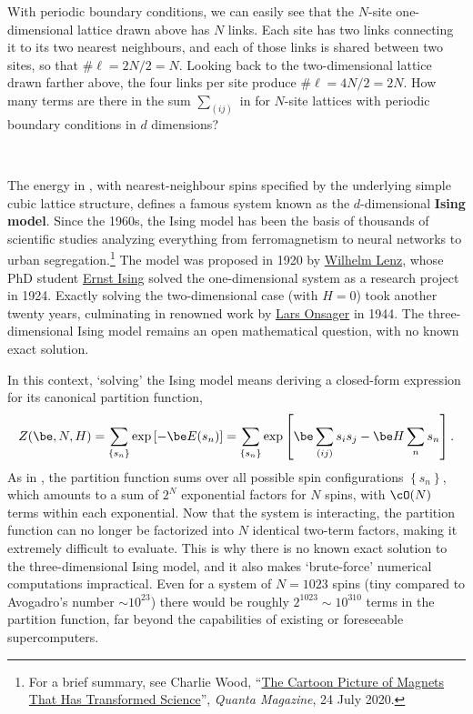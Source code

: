 With periodic boundary conditions, we can easily see that the $N$-site one-dimensional lattice drawn above has $N$ links.
Each site has two links connecting it to its two nearest neighbours, and each of those links is shared between two sites, so that $\#\ell = 2N / 2 = N$.
Looking back to the two-dimensional lattice drawn farther above, the four links per site produce $\#\ell = 4N / 2 = 2N$.
How many terms are there in the sum $\sum_{(ij)}$ in  for $N$-site lattices with periodic boundary conditions in $d$ dimensions?
\begin{mdframed}
  \ \\[50 pt]
\end{mdframed}

The energy in , with nearest-neighbour spins specified by the underlying simple cubic lattice structure, defines a famous system known as the $d$-dimensional \textbf{Ising model}.
Since the 1960s, the Ising model has been the basis of thousands of scientific studies analyzing everything from ferromagnetism to neural networks to urban segregation.\footnote{For a brief summary, see Charlie Wood, ``\href{https://www.quantamagazine.org/the-cartoon-picture-of-magnets-that-has-transformed-science-20200624/}{The Cartoon Picture of Magnets That Has Transformed Science}'', \textit{Quanta Magazine}, 24 July 2020.}
The model was proposed in 1920 by \href{https://en.wikipedia.org/wiki/Wilhelm_Lenz}{Wilhelm Lenz}, whose PhD student \href{https://en.wikipedia.org/wiki/Ernst_Ising}{Ernst Ising} solved the one-dimensional system as a research project in 1924.
Exactly solving the two-dimensional case (with $H = 0$) took another twenty years, culminating in renowned work by \href{https://en.wikipedia.org/wiki/Lars_Onsager}{Lars Onsager} in 1944.
The three-dimensional Ising model remains an open mathematical question, with no known exact solution.

In this context, `solving' the Ising model means deriving a closed-form expression for its canonical partition function,
\begin{equation*}
  Z(\be, N, H) = \sum_{\left\{s_n\right\}} \exp\left[-\be E(s_n)\right] = \sum_{\left\{s_n\right\}} \exp\left[\be\sum_{(ij)} s_i s_j - \be H \sum_n s_n\right].
\end{equation*}
As in , the partition function sums over all possible spin configurations $\left\{s_n\right\}$, which amounts to a sum of $2^N$ exponential factors for $N$ spins, with $\cO(N)$ terms within each exponential.
Now that the system is interacting, the partition function can no longer be factorized into $N$ identical two-term factors, making it extremely difficult to evaluate.
This is why there is no known exact solution to the three-dimensional Ising model, and it also makes `brute-force' numerical computations impractical.
Even for a system of $N = 1023$ spins (tiny compared to Avogadro's number $\sim 10^{23}$) there would be roughly $2^{1023} \sim 10^{310}$ terms in the partition function, far beyond the capabilities of existing or foreseeable supercomputers.



